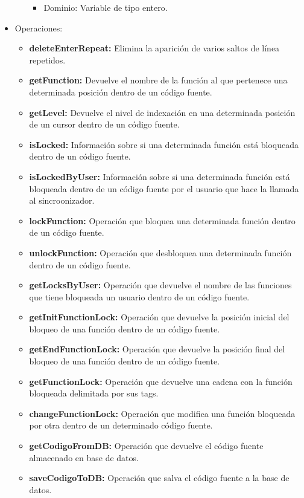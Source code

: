 \begin{itemize}
\begin{itemize}
\begin{itemize}
					\item Dominio: Variable de tipo entero.
				\end{itemize}
		\end{itemize}
	\item Operaciones:
		\begin{itemize}
			\item \textbf{deleteEnterRepeat:} Elimina la aparición de varios saltos de línea repetidos.
			\item \textbf{getFunction:} Devuelve el nombre de la función al que pertenece una determinada posición dentro de un código fuente.
			\item \textbf{getLevel:} Devuelve el nivel de indexación en una determinada posición de un cursor dentro de un código fuente.
			\item \textbf{isLocked:} Información sobre si una determinada función está bloqueada dentro de un código fuente.
			\item \textbf{isLockedByUser:} Información sobre si una determinada función está bloqueada dentro de un código fuente por el usuario que hace la llamada al sincroonizador.
			\item \textbf{lockFunction:} Operación que bloquea una determinada función dentro de un código fuente.
			\item \textbf{unlockFunction:} Operación que desbloquea una determinada función dentro de un código fuente.
			\item \textbf{getLocksByUser:} Operación que devuelve el nombre de las funciones que tiene bloqueada un usuario dentro de un código fuente.
			\item \textbf{getInitFunctionLock:} Operación que devuelve la posición inicial del bloqueo de una función dentro de un código fuente.
			\item \textbf{getEndFunctionLock:} Operación que devuelve la posición final del bloqueo de una función dentro de un código fuente.
			\item \textbf{getFunctionLock:} Operación que devuelve una cadena con la función bloqueada delimitada por sus tags.
			\item \textbf{changeFunctionLock:} Operación que modifica una función bloqueada por otra dentro de un determinado código fuente.
			\item \textbf{getCodigoFromDB:} Operación que devuelve el código fuente almacenado en base de datos.
			\item \textbf{saveCodigoToDB:} Operación que salva el código fuente a la base de datos.

\end{itemize}
\end{itemize}
